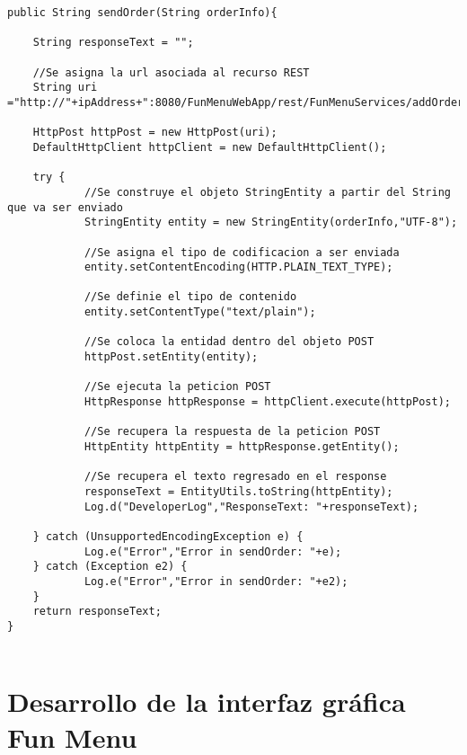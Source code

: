 \documentclass[letterpaper,12pt]{book}
\begin{document}
\begin{mainmatter}
\begin{scriptsize}
\begin{lstlisting}
public String sendOrder(String orderInfo){
		
	String responseText = "";

	//Se asigna la url asociada al recurso REST
	String uri ="http://"+ipAddress+":8080/FunMenuWebApp/rest/FunMenuServices/addOrder/";

	HttpPost httpPost = new HttpPost(uri);
	DefaultHttpClient httpClient = new DefaultHttpClient();

	try {
		    //Se construye el objeto StringEntity a partir del String que va ser enviado
		    StringEntity entity = new StringEntity(orderInfo,"UTF-8");

		    //Se asigna el tipo de codificacion a ser enviada
		    entity.setContentEncoding(HTTP.PLAIN_TEXT_TYPE);

		    //Se definie el tipo de contenido            
		    entity.setContentType("text/plain");

		    //Se coloca la entidad dentro del objeto POST  
		    httpPost.setEntity(entity);

		    //Se ejecuta la peticion POST 
		    HttpResponse httpResponse = httpClient.execute(httpPost);

		    //Se recupera la respuesta de la peticion POST
		    HttpEntity httpEntity = httpResponse.getEntity();

		    //Se recupera el texto regresado en el response
		    responseText = EntityUtils.toString(httpEntity);
		    Log.d("DeveloperLog","ResponseText: "+responseText);
	            
	} catch (UnsupportedEncodingException e) {
		    Log.e("Error","Error in sendOrder: "+e);          
	} catch (Exception e2) {
		    Log.e("Error","Error in sendOrder: "+e2);				
	}
	return responseText;
}
  
\end{lstlisting}
\end{scriptsize}

\section{Desarrollo de la interfaz gráfica Fun Menu}


\end{mainmatter}
\end{document}
